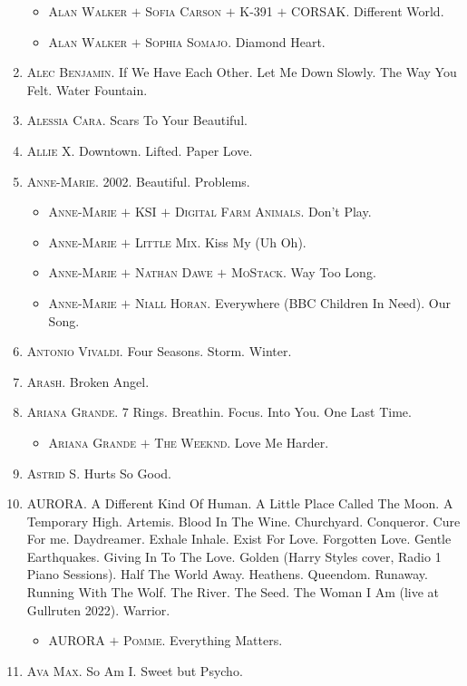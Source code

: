 \documentclass{article}
\begin{document}
\begin{enumerate}
\begin{itemize}
		\item \textsc{Alan Walker $+$ Sofia Carson $+$ K-391 $+$ CORSAK.} Different World.
		\item \textsc{Alan Walker $+$ Sophia Somajo.} Diamond Heart.
	\end{itemize}
	\item \textsc{Alec Benjamin.} If We Have Each Other. Let Me Down Slowly. The Way You Felt. Water Fountain.
	\item \textsc{Alessia Cara.} Scars To Your Beautiful.
	\item \textsc{Allie X.} Downtown. Lifted. Paper Love.
	\item \textsc{Anne-Marie.} 2002. Beautiful. Problems.
	\begin{itemize}
		\item \textsc{Anne-Marie $+$ KSI $+$ Digital Farm Animals.} Don't Play.
		\item \textsc{Anne-Marie $+$ Little Mix.} Kiss My (Uh Oh).
		\item \textsc{Anne-Marie $+$ Nathan Dawe $+$ MoStack.} Way Too Long.
		\item \textsc{Anne-Marie $+$ Niall Horan.} Everywhere (BBC Children In Need). Our Song.
	\end{itemize}
	\item \textsc{Antonio Vivaldi.} Four Seasons. Storm. Winter.
	\item \textsc{Arash.} Broken Angel.
	\item \textsc{Ariana Grande.} 7 Rings. Breathin. Focus. Into You. One Last Time.
	\begin{itemize}
		\item \textsc{Ariana Grande $+$ The Weeknd.} Love Me Harder.
	\end{itemize}
	\item \textsc{Astrid S.} Hurts So Good.
	\item \textsc{AURORA.} A Different Kind Of Human. A Little Place Called The Moon. A Temporary High. Artemis. Blood In The Wine. Churchyard. Conqueror. Cure For me. Daydreamer. Exhale Inhale. Exist For Love. Forgotten Love. Gentle Earthquakes. Giving In To The Love. Golden (Harry Styles  cover, Radio 1 Piano Sessions). Half The World Away. Heathens. Queendom. Runaway. Running With The Wolf. The River. The Seed. The Woman I Am (live at Gullruten 2022). Warrior.
	\begin{itemize}
		\item \textsc{AURORA $+$ Pomme.} Everything Matters.
	\end{itemize}
	\item \textsc{Ava Max.} So Am I. Sweet but Psycho.	

\end{enumerate}
\end{document}
